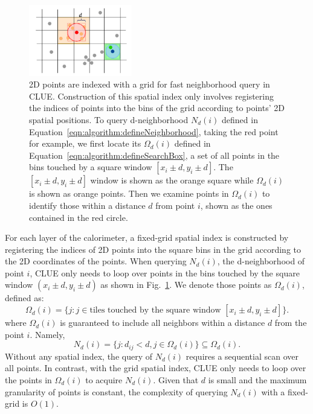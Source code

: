 \begin{figure}[ht]
    \centering
    \includegraphics[width=0.4\textwidth]{chapters/HGCal/figures/clue/Figure1.png}
    \caption{2D points are indexed with a grid for fast neighborhood query in CLUE. Construction of this spatial index only involves registering the indices of points into the bins of the grid according to points' 2D spatial positions. To query d-neighborhood $N_d(i)$ defined in Equation~\ref{eqn:algorithm:defineNeighborhood}, taking the red point for example, we first locate its $\Omega_d(i)$ defined in Equation~\ref{eqn:algorithm:defineSearchBox}, a set of all points in the bins touched by a square window $[x_i\pm d,y_i\pm d]$. The $[x_i\pm d,y_i\pm d]$ window is shown as the orange square while $\Omega_d(i)$ is shown as orange points. Then we examine points in $\Omega_d(i)$ to identify those within a distance $d$ from point $i$, shown as the ones contained in the red circle.}
    \label{fig:algorithm:searchBox}
\end{figure}


For each layer of the calorimeter, a fixed-grid spatial index is constructed by registering the indices of 2D points into the square bins in the grid according to the 2D coordinates of the points. When querying $N_d(i)$, the d-neighborhood of point $i$, CLUE only needs to loop over points in the bins touched by the square window $(x_i\pm d,y_i\pm d)$ as shown in Fig.~\ref{fig:algorithm:searchBox}. We denote those points as $\Omega_d(i)$, defined as:
\begin{equation} \label{eqn:algorithm:defineSearchBox}
    \Omega_d(i) = \{j : j \in \textrm{tiles touched by the square window } [x_i\pm d,y_i\pm d] \}.
\end{equation}
\noindent where $\Omega_d(i)$ is guaranteed to include all neighbors within a distance $d$ from the point $i$. Namely, 
\begin{equation} \label{eqn:algorithm:defineNeighborhood}
    N_d(i)=\{j: d_{ij}<d, j \in \Omega_d(i) \} \subseteq \Omega_d(i).
\end{equation}
\noindent Without any spatial index, the query of $N_d(i)$ requires a sequential scan over all points. In contrast, with the grid spatial index, CLUE only needs to loop over the points in $\Omega_d(i)$ to acquire $N_d(i)$. Given that $d$ is small and the maximum granularity of points is constant, the complexity of querying $N_d(i)$ with a fixed-grid is $O(1)$.


